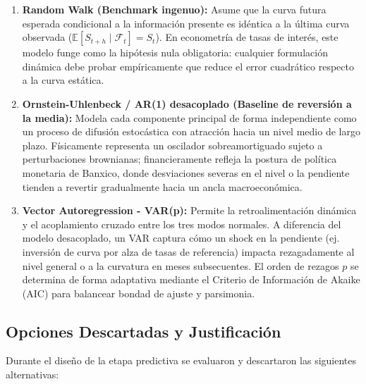 \documentclass[11pt]{article}
\begin{document}
\begin{enumerate}
    \item \textbf{Random Walk (Benchmark ingenuo):} Asume que la curva futura esperada condicional a la información presente es idéntica a la última curva observada ($\mathbb{E}[S_{t+h} \mid \mathcal{F}_t] = S_t$). En econometría de tasas de interés, este modelo funge como la hipótesis nula obligatoria: cualquier formulación dinámica debe probar empíricamente que reduce el error cuadrático respecto a la curva estática.
    
    \item \textbf{Ornstein-Uhlenbeck / AR(1) desacoplado (Baseline de reversión a la media):} Modela cada componente principal de forma independiente como un proceso de difusión estocástica con atracción hacia un nivel medio de largo plazo. Físicamente representa un oscilador sobreamortiguado sujeto a perturbaciones brownianas; financieramente refleja la postura de política monetaria de Banxico, donde desviaciones severas en el nivel o la pendiente tienden a revertir gradualmente hacia un ancla macroeconómica.
    
    \item \textbf{Vector Autoregression - VAR(p):} Permite la retroalimentación dinámica y el acoplamiento cruzado entre los tres modos normales. A diferencia del modelo desacoplado, un VAR captura cómo un shock en la pendiente (ej. inversión de curva por alza de tasas de referencia) impacta rezagadamente al nivel general o a la curvatura en meses subsecuentes. El orden de rezagos $p$ se determina de forma adaptativa mediante el Criterio de Información de Akaike (AIC) para balancear bondad de ajuste y parsimonia.
\end{enumerate}

\subsection{Opciones Descartadas y Justificación}

Durante el diseño de la etapa predictiva se evaluaron y descartaron las siguientes alternativas:
\end{document}
